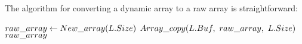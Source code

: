 \HdrDynArrayImpl

The algorithm for converting a dynamic array to a raw array is straightforward:

\begin{algorithm}[H]
	\begin{algorithmic}
		\Function{$\FuncToArray$}{$\VarList$}
			\State $raw\_array \gets New\_array(L.Size)$
			\State $\FuncArrayCopy(\VarList.\FieldBuffer,\ \LclRawArray,\ \VarList.\FieldSize)$
			\State \Return $raw\_array$
		\EndFunction
	\end{algorithmic}
\end{algorithm}